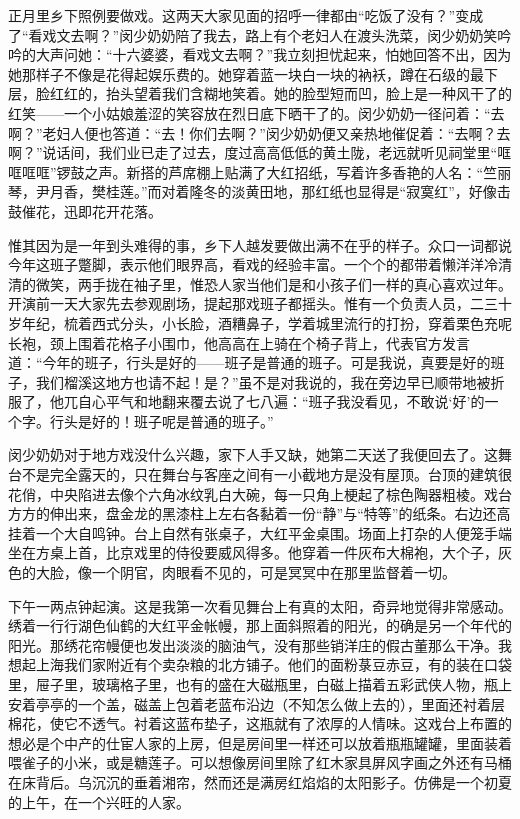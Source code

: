 \par 正月里乡下照例要做戏。这两天大家见面的招呼一律都由“吃饭了没有？”变成了“看戏文去啊？”闵少奶奶陪了我去，路上有个老妇人在渡头洗菜，闵少奶奶笑吟吟的大声问她：“十六婆婆，看戏文去啊？”我立刻担忧起来，怕她回答不出，因为她那样子不像是花得起娱乐费的。她穿着蓝一块白一块的衲袄，蹲在石级的最下层，脸红红的，抬头望着我们含糊地笑着。她的脸型短而凹，脸上是一种风干了的红笑——一个小姑娘羞涩的笑容放在烈日底下晒干了的。闵少奶奶一径问着：“去啊？”老妇人便也答道：“去！你们去啊？”闵少奶奶便又亲热地催促着：“去啊？去啊？”说话间，我们业已走了过去，度过高高低低的黄土陇，老远就听见祠堂里“哐哐哐哐”锣鼓之声。新搭的芦席棚上贴满了大红招纸，写着许多香艳的人名：“竺丽琴，尹月香，樊桂莲。”而对着隆冬的淡黄田地，那红纸也显得是“寂寞红”，好像击鼓催花，迅即花开花落。
\par 惟其因为是一年到头难得的事，乡下人越发要做出满不在乎的样子。众口一词都说今年这班子蹩脚，表示他们眼界高，看戏的经验丰富。一个个的都带着懒洋洋冷清清的微笑，两手拢在袖子里，惟恐人家当他们是和小孩子们一样的真心喜欢过年。开演前一天大家先去参观剧场，提起那戏班子都摇头。惟有一个负责人员，二三十岁年纪，梳着西式分头，小长脸，酒糟鼻子，学着城里流行的打扮，穿着栗色充呢长袍，颈上围着花格子小围巾，他高高在上骑在个椅子背上，代表官方发言道：“今年的班子，行头是好的——班子是普通的班子。可是我说，真要是好的班子，我们榴溪这地方也请不起！是？”虽不是对我说的，我在旁边早已顺带地被折服了，他兀自心平气和地翻来覆去说了七八遍：“班子我没看见，不敢说‘好’的一个字。行头是好的！班子呢是普通的班子。”
\par 闵少奶奶对于地方戏没什么兴趣，家下人手又缺，她第二天送了我便回去了。这舞台不是完全露天的，只在舞台与客座之间有一小截地方是没有屋顶。台顶的建筑很花俏，中央陷进去像个六角冰纹乳白大碗，每一只角上梗起了棕色陶器粗棱。戏台方方的伸出来，盘金龙的黑漆柱上左右各黏着一份“静”与“特等”的纸条。右边还高挂着一个大自鸣钟。台上自然有张桌子，大红平金桌围。场面上打杂的人便笼手端坐在方桌上首，比京戏里的侍役要威风得多。他穿着一件灰布大棉袍，大个子，灰色的大脸，像一个阴官，肉眼看不见的，可是冥冥中在那里监督着一切。
\par 下午一两点钟起演。这是我第一次看见舞台上有真的太阳，奇异地觉得非常感动。绣着一行行湖色仙鹤的大红平金帐幔，那上面斜照着的阳光，的确是另一个年代的阳光。那绣花帘幔便也发出淡淡的脑油气，没有那些销洋庄的假古董那么干净。我想起上海我们家附近有个卖杂粮的北方铺子。他们的面粉菉豆赤豆，有的装在口袋里，屉子里，玻璃格子里，也有的盛在大磁瓶里，白磁上描着五彩武侠人物，瓶上安着亭亭的一个盖，磁盖上包着老蓝布沿边（不知怎么做上去的），里面还衬着层棉花，使它不透气。衬着这蓝布垫子，这瓶就有了浓厚的人情味。这戏台上布置的想必是个中产的仕宦人家的上房，但是房间里一样还可以放着瓶瓶罐罐，里面装着喂雀子的小米，或是糖莲子。可以想像房间里除了红木家具屏风字画之外还有马桶在床背后。乌沉沉的垂着湘帘，然而还是满房红焰焰的太阳影子。仿佛是一个初夏的上午，在一个兴旺的人家。
